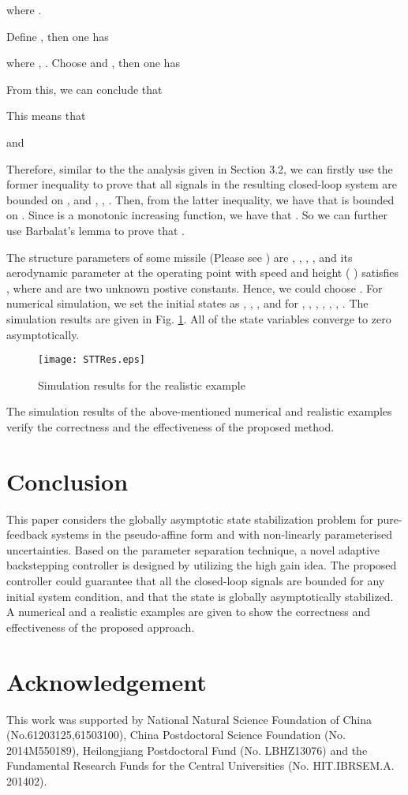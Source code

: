 \documentclass{tSYS2e}
\theoremstyle{plain}
\theoremstyle{definition}
\begin{document}
where .

Define , then one has

where ,  . Choose  and , then one has

From this, we can conclude that

This means that

and

Therefore, similar to the the analysis given in Section 3.2, we can firstly use the former inequality to prove that
all signals in the resulting closed-loop system are bounded on , and
, , . Then, from the latter inequality, we have that
 is bounded on . Since
 is a monotonic increasing function,
we have that .
So we can further use Barbalat's lemma to prove that .


The structure parameters of some missile (Please see \cite{Hou2013}) are  , 
,  , , and its aerodynamic
parameter  at the operating point
with speed   and height   (
) satisfies , where  and  are two unknown postive constants. Hence, we could choose . For
numerical simulation, we set the initial states as ,
 , , and
for , , , , ,
, .
The simulation results are
given in  Fig. \ref{fig2}. All of the state variables converge to zero asymptotically.

\begin{figure}[!htb]
  \centering
  \texttt{[image: STTRes.eps]}
  \caption{Simulation results for the realistic example}
  \label{fig2}
\end{figure}

The simulation results of the above-mentioned numerical and realistic examples verify the correctness and the effectiveness of the proposed method.


\section{Conclusion}
This paper considers the globally asymptotic state stabilization problem for
pure-feedback systems in the pseudo-affine form and with non-linearly parameterised uncertainties.
Based on the parameter separation technique, a novel adaptive backstepping controller is designed
by utilizing the high gain idea. The proposed controller could guarantee that
all the closed-loop signals are bounded for any initial system condition, and that the state is globally asymptotically stabilized.
A numerical and a realistic examples are given to show the correctness and effectiveness of the proposed approach.

\section{Acknowledgement}
This work was supported by National Natural Science Foundation of China (No.61203125,61503100),
China Postdoctoral Science Foundation (No. 2014M550189), Heilongjiang Postdoctoral Fund (No. LBHZ13076)
and the Fundamental Research Funds for the Central Universities (No. HIT.IBRSEM.A. 201402).
\end{document}
